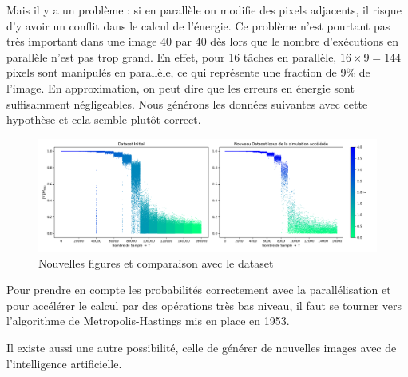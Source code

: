 \documentclass[11pt, parskip=half]{scrartcl} %
\begin{document}
Mais il y a un problème : si en parallèle on modifie des pixels adjacents, il risque d'y avoir un conflit dans le calcul de l'énergie. Ce problème n'est pourtant pas très important dans une image 40 par 40 dès lors que le nombre d'exécutions en parallèle n'est pas trop grand. En effet, pour 16 tâches en parallèle, $16 \times 9 = 144$ pixels sont manipulés en parallèle, ce qui représente une fraction de 9\% de l'image. En approximation, on peut dire que les erreurs en énergie sont suffisamment négligeables. Nous générons les données suivantes avec cette hypothèse et cela semble plutôt correct.

\begin{figure}[h]
	\centering
	\includegraphics[width=0.95\linewidth]{./figures/new_data_compare.png}
	\caption{Nouvelles figures et comparaison avec le dataset}
	\label{fig:H}
\end{figure}

Pour prendre en compte les probabilités correctement avec la parallélisation et pour accélérer le calcul par des opérations très bas niveau, il faut se tourner vers l'algorithme de Metropolis-Hastings mis en place en 1953.

Il existe aussi une autre possibilité, celle de générer de nouvelles images avec de l'intelligence artificielle.
\end{document}
